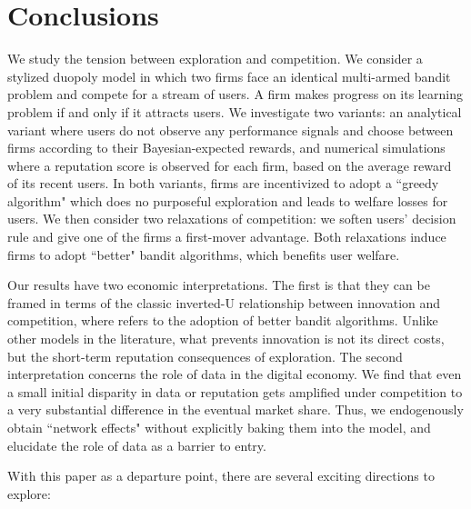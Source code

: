 \documentclass[../competing_bandits.tex]{subfiles}
\begin{document}
\section{Conclusions}\label{sec:conclusion}

We study the tension between exploration and competition. We consider a stylized duopoly model in which two firms face an identical multi-armed bandit problem and compete for a stream of users. A firm makes progress on its learning problem if and only if it attracts users. We investigate two variants: an analytical variant where users do not observe any performance signals and choose between firms according to their Bayesian-expected rewards, and numerical simulations where a reputation score is observed for each firm, based on the average reward of its recent users.  In both variants, firms are incentivized to adopt a ``greedy algorithm" which does no purposeful exploration and leads to welfare losses for users. We then consider two relaxations of competition: we soften users' decision rule and give one of the firms a first-mover advantage. Both relaxations induce firms to adopt ``better" bandit algorithms, which benefits user welfare.


Our results have two economic interpretations. The first is that they can be framed in terms of the classic inverted-U relationship between innovation and competition, where \innovation refers to the adoption of better bandit algorithms. Unlike other models in the literature, what prevents innovation is not its direct costs, but the short-term reputation consequences of exploration. The second interpretation concerns the role of data in the digital economy. We find that even a small initial disparity in data or reputation gets amplified under competition to a very substantial difference in the eventual market share. Thus, we endogenously obtain ``network effects" without explicitly baking them into the model, and elucidate the role of data as a barrier to entry.

With this paper as a departure point, there are several exciting directions to explore:
\end{document}
